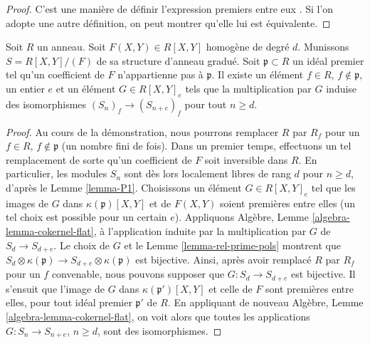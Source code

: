 \begin{proof}
C'est une mani\`ere de d\'efinir l'expression \og premiers entre eux \fg. Si
l'on adopte une autre d\'efinition, on peut montrer qu'elle lui est \'equivalente.
\end{proof}

\begin{lemma}
\label{lemma-P1-localize}
Soit $R$ un anneau. Soit $F(X, Y) \in R[X, Y]$ homog\`ene de degr\'e
$d$. Munissons $S = R[X, Y]/(F)$ de sa structure d'anneau gradu\'e.
Soit $\mathfrak p \subset R$ un id\'eal premier tel qu'un
coefficient de $F$ n'appartienne pas \`a $\mathfrak p$.
Il existe un \'el\'ement $f \in R$, $f \not\in \mathfrak p$,
un entier $e$ et un \'el\'ement $G \in R[X, Y]_e$
tels que la multiplication par $G$ induise des isomorphismes
$(S_n)_f \to (S_{n + e})_f$ pour tout $n \geq d$.
\end{lemma}

\begin{proof}
Au cours de la d\'emonstration, nous pourrons remplacer $R$ par $R_f$
pour un $f\in R$, $f\not\in \mathfrak p$ (un nombre fini de fois).
Dans un premier temps, effectuons un tel remplacement de sorte
qu'un coefficient de $F$ soit inversible dans $R$.
En particulier, les modules $S_n$ sont d\`es lors localement
libres de rang $d$ pour $n \geq d$, d'apr\`es le Lemme \ref{lemma-P1}.
Choisissons un \'el\'ement $G \in R[X, Y]_e$ tel que les images de
$G$ dans $\kappa(\mathfrak p)[X, Y]$ et de
$F(X, Y)$ soient premi\`eres entre elles (un tel choix est possible pour un certain $e$).
Appliquons Alg\`ebre, Lemme \ref{algebra-lemma-cokernel-flat}, \`a l'application
induite par la multiplication par $G$ de $S_d \to S_{d + e}$.
Le choix de $G$ et le Lemme \ref{lemma-rel-prime-pols}
montrent que
$S_d \otimes \kappa(\mathfrak p) \to S_{d + e} \otimes \kappa(\mathfrak p)$
est bijective. Ainsi, apr\`es avoir remplac\'e $R$ par $R_f$ pour un
$f$ convenable, nous pouvons supposer que $G : S_d \to S_{d + e}$
est bijective. Il s'ensuit que l'image
de $G$ dans $\kappa(\mathfrak p')[X, Y]$ et celle de
$F$ sont premi\`eres entre elles, pour tout id\'eal premier $\mathfrak p'$
de $R$. En appliquant de nouveau Alg\`ebre, Lemme
\ref{algebra-lemma-cokernel-flat}, on voit alors que toutes les applications
$G : S_n \to S_{n + e}$, $n \geq d$, sont des isomorphismes.
\end{proof}

